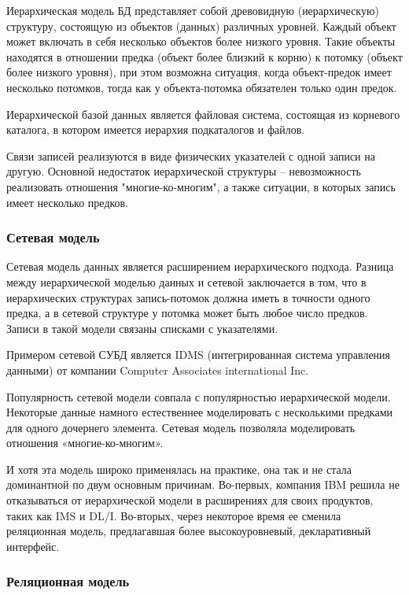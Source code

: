 Иерархическая модель БД представляет собой древовидную (иерархическую) структуру, состоящую из объектов (данных) различных уровней. Каждый объект может включать в себя несколько объектов более низкого уровня. Такие объекты находятся в отношении предка (объект более близкий к корню) к потомку (объект более низкого уровня), при этом возможна ситуация, когда объект-предок имеет несколько потомков, тогда как у объекта-потомка обязателен только один предок.

Иерархической базой данных является файловая система, состоящая из корневого каталога, в котором имеется иерархия подкаталогов и файлов.

Связи записей реализуются в виде физических указателей с одной записи на другую. Основной недостаток иерархической структуры – невозможность реализовать отношения "многие-ко-многим", а также ситуации, в которых запись имеет несколько предков. \cite{litlink1}

\subsubsection*{Сетевая модель}
Сетевая модель данных является расширением иерархического подхода. 
Разница между иерархической моделью данных и сетевой заключается в том, что в иерархических структурах запись-потомок должна иметь в точности одного предка, а в сетевой структуре у потомка может быть любое число предков. 
Записи в такой модели связаны списками с указателями.

Примером сетевой СУБД является IDMS (интегрированная система управления данными) от компании Computer Associates international Inc.

Популярность сетевой модели совпала с популярностью иерархической модели. 
Некоторые данные намного естественнее моделировать с несколькими предками для одного дочернего элемента. 
Сетевая модель позволяла моделировать отношения «многие-ко-многим».

И хотя эта модель широко применялась на практике, она так и не стала доминантной по двум основным причинам. 
Во-первых, компания IBM решила не отказываться от иерархической модели в расширениях для своих продуктов, таких как IMS и DL/I. 
Во-вторых, через некоторое время ее сменила реляционная модель, предлагавшая более высокоуровневый, декларативный интерфейс. \cite{litlink1}

\subsubsection*{Реляционная модель}

